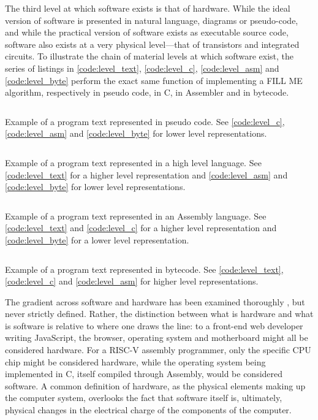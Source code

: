 The third level at which software exists is that of hardware. While the ideal version of software is presented in natural language, diagrams or pseudo-code, and while the practical version of software exists as executable source code, software also exists at a very physical level—that of transistors and integrated circuits. To illustrate the chain of material levels at which software exist, the series of listings in \ref{code:level_text}, \ref{code:level_c}, \ref{code:level_asm} and \ref{code:level_byte} perform the exact same function of implementing a FILL ME  algorithm, respectively in pseudo code, in C, in Assembler and in bytecode.

\begin{listing}
    \inputminted{text}{./corpus/level.txt}
    \caption{Example of a program text represented in pseudo code. See \ref{code:level_c}, \ref{code:level_asm} and \ref{code:level_byte} for lower level representations.}
    \label{code:level_text}
\end{listing}

\begin{listing}
    \inputminted{c}{./corpus/level.c}
    \caption{Example of a program text represented in a high level language. See \ref{code:level_text} for a higher level representation and \ref{code:level_asm} and \ref{code:level_byte} for lower level representations.}
    \label{code:level_c}
\end{listing}

\begin{listing}
    \inputminted{asm}{./corpus/level.asm}
    \caption{Example of a program text represented in an Assembly language. See \ref{code:level_text} and \ref{code:level_c} for a higher level representation and \ref{code:level_byte} for a lower level representation.}
    \label{code:level_asm}
\end{listing}

\begin{listing}
    \inputminted{text}{./corpus/level.byte}
    \caption{Example of a program text represented in bytecode. See \ref{code:level_text}, \ref{code:level_c} and \ref{code:level_asm} for higher level representations.}
    \label{code:level_byte}
\end{listing}

The gradient across software and hardware has been examined thoroughly \citep{kittler_there_1997,chun_sourcery_2008,rapaport_philosophy_2005}, but never strictly defined. Rather, the distinction between what is hardware and what is software is relative to where one draws the line: to a front-end web developer writing JavaScript, the browser, operating system and motherboard might all be considered hardware. For a RISC-V assembly programmer, only the specific CPU chip might be considered hardware, while the operating system being implemented in C, itself compiled through Assembly, would be considered software. A common definition of hardware, as the physical elements making up the computer system, overlooks the fact that software itself is, ultimately, physical changes in the electrical charge of the components of the computer.

